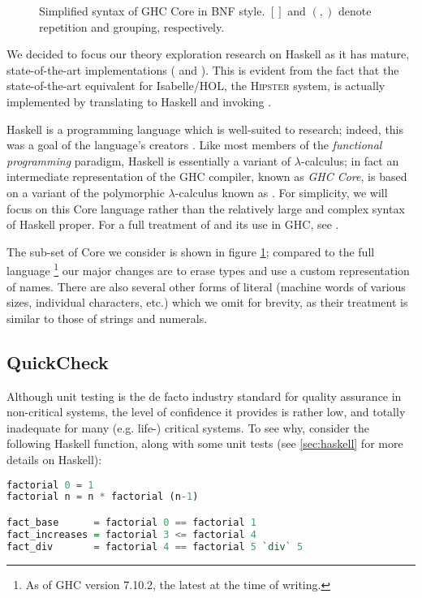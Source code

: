 \begin{figure}
  \caption{Simplified syntax of GHC Core in BNF style. $[]$ and $(,)$ denote repetition and grouping, respectively.}
  \label{fig:coresyntax}
\end{figure}

We decided to focus our theory exploration research on Haskell as it has mature, state-of-the-art implementations (\qspec{} \citep{QuickSpec} and \hspec{} \citep{claessen2013automating}). This is evident from the fact that the state-of-the-art equivalent for Isabelle/HOL, the \textsc{Hipster} \citep{Hipster} system, is actually implemented by translating to Haskell and invoking \hspec{}.

Haskell is a programming language which is well-suited to research; indeed, this was a goal of the language's creators \citep{marlow2010haskell}. Like most members of the \emph{functional programming} paradigm, Haskell is essentially a variant of $\lambda$-calculus; in fact an intermediate representation of the \textsc{GHC} compiler, known as \emph{GHC Core}, is based on a variant of the polymorphic $\lambda$-calculus known as \fc{}. For simplicity, we will focus on this Core language rather than the relatively large and complex syntax of Haskell proper. For a full treatment of \fc{} and its use in GHC, see \citep[Appendix C]{sulzmann2007system}.

The sub-set of Core we consider is shown in figure \ref{fig:coresyntax}; compared to the full language \footnote{As of GHC version 7.10.2, the latest at the time of writing.} our major changes are to erase types and use a custom representation of names. There are also several other forms of literal (machine words of various sizes, individual characters, etc.) which we omit for brevity, as their treatment is similar to those of strings and numerals.

\subsection{QuickCheck}
\label{sec:quickcheck}

Although unit testing is the de facto industry standard for quality assurance in non-critical systems, the level of confidence it provides is rather low, and totally inadequate for many (e.g. life-) critical systems. To see why, consider the following Haskell function, along with some unit tests (see \ref{sec:haskell} for more details on Haskell):

\begin{lstlisting}[language=Haskell, xleftmargin=.2\textwidth, xrightmargin=.2\textwidth]
factorial 0 = 1
factorial n = n * factorial (n-1)

fact_base      = factorial 0 == factorial 1
fact_increases = factorial 3 <= factorial 4
fact_div       = factorial 4 == factorial 5 `div` 5
\end{lstlisting}

